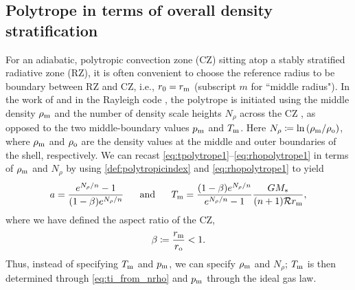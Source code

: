 \documentclass[12pt]{article} %
\newcommand{\rrm}{r_{\rm{m}}}
\begin{document}
\subsection{Polytrope in terms of overall density stratification}
For an adiabatic, polytropic convection zone (CZ) sitting atop a stably stratified radiative zone (RZ), it is often convenient to choose the reference radius to be boundary between RZ and CZ, i.e., $r_0=\rrm$ (subscript $m$ for ``middle radius"). In the work of \citet{Jones11} and in the Rayleigh code \citep{Featherstone18}, the polytrope is initiated using the middle density $\rho_{\rm{m}}$ and the number of density scale heights $N_\rho$ across the CZ , as opposed to the two middle-boundary values $p_{\rm{m}}$ and $T_{\rm{m}}$. Here $N_\rho\coloneqq\ln{(\rho_{\rm{m}}/\rho_{\rm{o}})}$, where $\rho_{\rm{m}}$ and $\rho_{\rm{o}}$ are the density values at the middle and outer boundaries of the shell, respectively. We can recast \eqref{eq:tpolytrope1}--\eqref{eq:rhopolytrope1} in terms of $\rho_{\rm{m}}$ and $N_\rho$ by using \eqref{def:polytropicindex} and \eqref{eq:rhopolytrope1} to yield
\begin{align}
a = \frac{e^{N_\rho/n} - 1 }{(1 - \beta)e^{N_\rho/n}} \five \andd T_{\rm{m}} = \frac{(1 - \beta)e^{N_\rho/n}} {e^{N_\rho/n} - 1 }\frac{G\mstar}{(n+1)\gasconst \rrm},
\label{eq:ti_from_nrho}
\end{align}
where we have defined the aspect ratio of the CZ,
\begin{align}
\beta\coloneqq \frac{\rrm}{r_{\rm{o}}} < 1.
\label{def:beta}
\end{align}
Thus, instead of specifying $T_{\rm{m}}$ and $p_{\rm{m}}$, we can specify $\rho_{\rm{m}}$ and $N_\rho$; $T_{\rm{m}}$ is then determined through \eqref{eq:ti_from_nrho} and $p_{\rm{m}}$ through the ideal gas law. 
\end{document}

